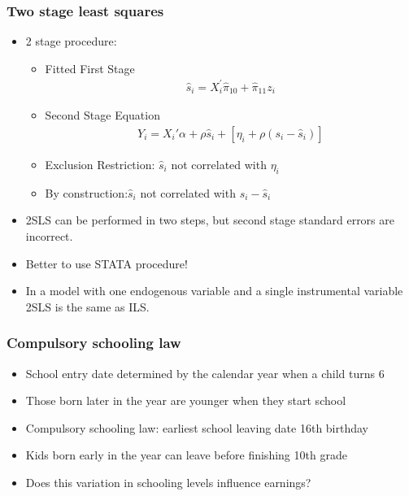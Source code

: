 \documentclass[pdftex]{beamer}
\begin{document}

\begin{frame}
\frametitle{Two stage least squares}
\begin{itemize}
\item 2 stage procedure:
   \begin{itemize}
      \item Fitted First Stage
        \begin{eqnarray*}
       \hat{s}_{i}= X_{i}^{'}\hat{\pi}_{10}+\hat{\pi}_{11}z_{i}
        \end{eqnarray*}

      \item Second Stage Equation
        \begin{eqnarray*}
           Y_{i}= X_{i}' \alpha + \rho \hat{s}_{i} + [\eta_i + \rho (s_i-\hat{s}_{i})]
       \end{eqnarray*}
     \item Exclusion Restriction: $\hat{s}_{i}$ not correlated with $\eta_{i}$
     \item By construction:$\hat{s}_{i}$ not correlated with $s_i-\hat{s}_i$
\end {itemize}


\item  2SLS can be performed in two steps, but second stage standard errors are incorrect.
\item Better to use STATA procedure!
\item In a model with one endogenous variable and a single instrumental variable 2SLS is the same as ILS.


\end{itemize}

\end{frame}




\begin{frame}
\frametitle{Compulsory schooling law}

\begin{itemize}
\item School entry date determined by the calendar year when a child turns 6
\item Those born later in the year are younger when they start school
\item Compulsory schooling law: earliest school leaving date 16th birthday
\item Kids born early in the year can leave before finishing 10th grade
\item Does this variation in schooling levels influence earnings?
\end{itemize}

\end{frame}
\end{document}
